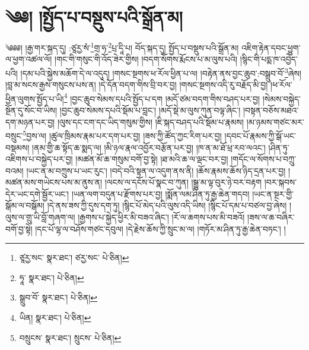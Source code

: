 \setcounter{footnote}{0} 
\chapter{༄༅། །སྤྱོད་པ་བསྡུས་པའི་སྒྲོན་མ།}༄༅༅། །རྒྱ་གར་སྐད་དུ། :ཙཱརྱ་སཾ་\footnote{ཙཱརྱ་སང་  སྣར་ཐང་། ཙརྱ་སང་  པེ་ཅིན། }གྲ་ཧ་\footnote{ཧཱ་  སྣར་ཐང་།  པེ་ཅིན། }པྲ་དཱི་པ། བོད་སྐད་དུ། སྤྱོད་པ་བསྡུས་པའི་སྒྲོན་མ། འཇིག་རྟེན་དབང་ཕྱུག་ལ་ཕྱག་འཚལ་ལོ། །གང་གི་གསུང་གི་འོད་ཟེར་གྱིས། །བདག་སོགས་རྨོངས་པ་མ་ལུས་པའི། །སྙིང་གི་པདྨ་ཁ་འབྱེད་པའི། །དམ་པའི་སྐྱེས་མཆོག་དེ་ལ་འདུད། །གསང་སྔགས་ཕ་རོལ་ཕྱིན་པ་ལ། །བརྟེན་ནས་བྱང་ཆུབ་:བསྒྲུབ་བོ་\footnote{སྒྲུབ་བོ་  སྣར་ཐང་།  པེ་ཅིན། }ཞེས། །བླ་མ་སངས་རྒྱས་གསུངས་པས་ན། །དེ་དོན་བདག་གིས་བྲི་བར་བྱ། །གསང་སྔགས་འདི་རུ་བརྗོད་མི་བྱ། །ཕ་རོལ་ཕྱིན་ལུགས་སྤྱོད་པ་ཡི།\footnote{ཡིན།  སྣར་ཐང་།  པེ་ཅིན། } །བྱང་ཆུབ་སེམས་དཔའི་སྤྱོད་པ་དག །མདོ་ཙམ་བདག་གིས་བཤད་པར་བྱ། །སེམས་བསྐྱེད་སྔོན་དུ་སོང་བ་ཡིས། །བྱང་ཆུབ་སེམས་དཔའི་སྡོམ་པ་བླང་། །མདོ་སྡེ་མ་ལུས་ཀུན་བལྟ་ཞིང་། །བསྟན་བཅོས་མཐའ་དག་མཉན་པར་བྱ། །ལུས་དང་ངག་དང་ཡིད་གསུམ་གྱིས། །ཇི་སྐད་བཤད་པའི་སྡོམ་པ་རྣམས། །མ་ཉམས་གཙང་མར་བསྲུང་\footnote{བསྲུངས་  སྣར་ཐང་། སྲུངས་  པེ་ཅིན། }བྱས་ལ། །ཚུལ་ཁྲིམས་རྣམ་པར་དག་པར་བྱ། །ཟས་ཀྱི་ཚོད་ཀྱང་རིག་པར་བྱ། །དབང་པོ་རྣམས་ཀྱི་སྒོ་ཡང་བསྡམས། །ནམ་གྱི་ཆ་སྟོད་ཆ་སྨད་ལ། །མི་ཉལ་རྣལ་འབྱོར་བརྩོན་པར་བྱ། །ཁ་ན་མ་ཐོ་ཕྲ་རབ་ལའང་། །ཤིན་ཏུ་འཇིགས་པ་བསྐྱེད་པར་བྱ། །མཚན་མོ་ཆ་གསུམ་བགོ་བྱ་སྟེ། །ཐ་མའི་ཆ་ལ་ལྡང་བར་བྱ། །གདོང་ལ་སོགས་པ་བཀྲུ་བའམ། །ཡང་ན་མ་བཀྲུས་པ་ཡང་རུང་། །བདེ་བའི་སྟན་ལ་འདུག་ནས་ནི། །ཆོས་རྣམས་ཆོས་ཉིད་དྲན་པར་བྱ། །མཚན་མས་གཡེངས་པས་མ་ནུས་ན། །ལངས་ལ་དངོས་པོ་སྣང་བ་ཀུན། །སྒྱུ་མ་ལྟ་བུར་ཉེ་བར་བརྟག །བར་སྐབས་དེར་ཡང་དགེ་སྦྱོར་ཡང་། །ཡན་ལག་བདུན་པ་རྫོགས་པར་བྱ། །སྨོན་ལམ་ཤིན་ཏུ་རྒྱ་ཆེན་གདབ། །ཡང་ན་སྔར་གྱི་སྒོམ་ལ་བསྒོམ། །དེ་ནས་ཟས་ཀྱི་དུས་དག་ཏུ། །སྙིང་པོ་མེད་པའི་ལུས་འདི་ཡིས། །སྙིང་པོ་དམ་པ་བཙལ་བྱ་ཞེས། །ལུས་ལ་གྲུ་ཡི་བློ་གཞག་ལ། །རྒྱགས་པ་སྐྱེད་ཕྱིར་མི་བཟའ་ཞིང་། །རོ་ལ་ཆགས་པས་མི་བཟའོ། །ཟས་ལ་ཆ་བཞིར་བགོ་བྱ་སྟེ། །དང་པོ་ལྷ་ལ་བཤོས་གཙང་དབུལ། །དེ་རྗེས་ཆོས་ཀྱི་སྲུང་མ་ལ། །གཏོར་མ་ཤིན་ཏུ་རྒྱ་ཆེན་བཏང་། །
